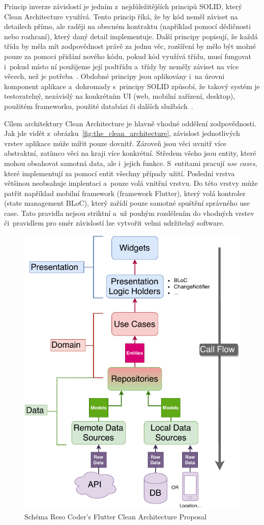Princip inverze závislostí je jedním z~nejdůležitějších principů SOLID,
který Clean Architecture využívá.
Tento princip říká,
že by kód neměl záviset na detailech přímo,
ale raději na obecném kontraktu
(například pomocí dědičnosti nebo rozhraní),
který daný detail implementuje.
Další principy popisují,
že každá třída by měla mít zodpovědnost právě za jednu
věc,
rozšíření by mělo být možné pouze za pomoci přidání nového kódu,
pokud kód využívá třídu,
musí fungovat i~pokud místo ní použijeme její podtřídu
a~třídy by neměly záviset na více věcech,
než je potřeba~\cite[str.~61--91]{martin_clean_architecture}.
Obdobné principy jsou aplikovány i~na úrovni komponent aplikace
a~dohromady s~principy SOLID způsobí,
že takový systém je testovatelný,
nezávislý na konkrétním UI (web, mobilní zařízení, desktop),
použitém frameworku, použité databázi či dalších
službách~\cite{the_clean_architecture}.

Cílem architektury Clean Architecture je hlavně vhodné oddělení zodpovědnosti.
Jak jde vidět z~obrázku~\ref{fig:the_clean_architecture},
závislost jednotlivých vrstev aplikace může mířit pouze dovnitř.
Zároveň jsou věci uvnitř více abstraktní,
zatímco věci na kraji více konkrétní.
Středem všeho jsou entity,
které mohou obsahovat samotná data,
ale i~jejich funkce.
S~entitami pracují \emph{use cases},
které implementují za pomocí entit všechny případy užití.
Poslední vrstva většinou neobsahuje implentaci
a~pouze volá vnitřní vrstvu.
Do této vrstvy může patřit například mobilní framework (framework Flutter),
který volá kontroler (state management BLoC),
který zařídí pouze samotné spuštění správného use case.
Tato pravidla nejsou striktní a~už pouhým rozdělením do vhodných vrstev
či~pravidlem pro směr závislostí lze vytvořit velmi udržitelný
software.~\cite{the_clean_architecture}

\begin{figure}[t!]
    \centering
    \includegraphics[width=0.7\linewidth]{assets/technology-research/architecture/reso-coder-clean-architecture.pdf}
    \caption{Schéma Reso Coder's Flutter Clean Architecture Proposal~\cite{reso_coder_clean_architecture}}
    \label{fig:reso_coder_clean_architecture}
\end{figure}


